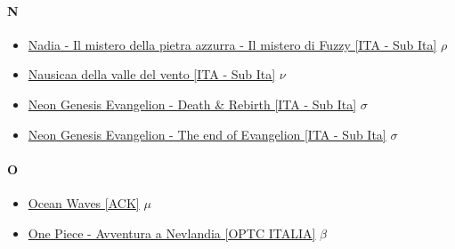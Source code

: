 		\paragraph{N} \hypertarget{FN}{}
			\begin{itemize}
			
				\item \href{https://mega.nz/#!1JwliBxC!O4d35kTzJG0uVtkwP4zQlb6iWimCzV93HcZGx4tBWZU} {Nadia - Il mistero della pietra azzurra - Il mistero di Fuzzy [ITA - Sub Ita]} $\rho$   \\
				\item \href{https://mega.nz/#!OlMGjTzS!-uNCbIeyzCj6cZqx6AZcUwsS4uC_qdeY5wAmRdVvox4} {Nausicaa della valle del vento [ITA - Sub Ita]} $\nu$   \\
				\item \href{https://mega.nz/#!JYt3QYpC!FQuoWiYAV0tZoOiG75Xe-W8mBWXzRSiurACTMPoNEeI} {Neon Genesis Evangelion - Death \& Rebirth [ITA - Sub Ita]} $\sigma$   \\
				\item \href{https://mega.nz/#!BQtwRKwI!kYOnmL0lz2tfDu7U0-gJeKZRO9p7kVxftejzFwVawog} {Neon Genesis Evangelion - The end of Evangelion [ITA - Sub Ita]} $\sigma$   \\
				
			\end{itemize}	
			
		\paragraph{O} \hypertarget{FO}{}
			\begin{itemize}
				
				\item \href{https://mega.nz/#!FxJ3wZIA!KehVat36VvXXWVXP5A_Gtd8dvi7awX_exNslLhz0F-4} {Ocean Waves [ACK]} $\mu$   \\
				\item \href{https://mega.nz/#!Dh5jgaKD!zvQfPUhz6wLpGKGxBcvnI1jmgC_adf12uqR6kbNSn5Q} {One Piece - Avventura a Nevlandia [OPTC ITALIA]} $\beta$   \\  
			
			\end{itemize}
		
